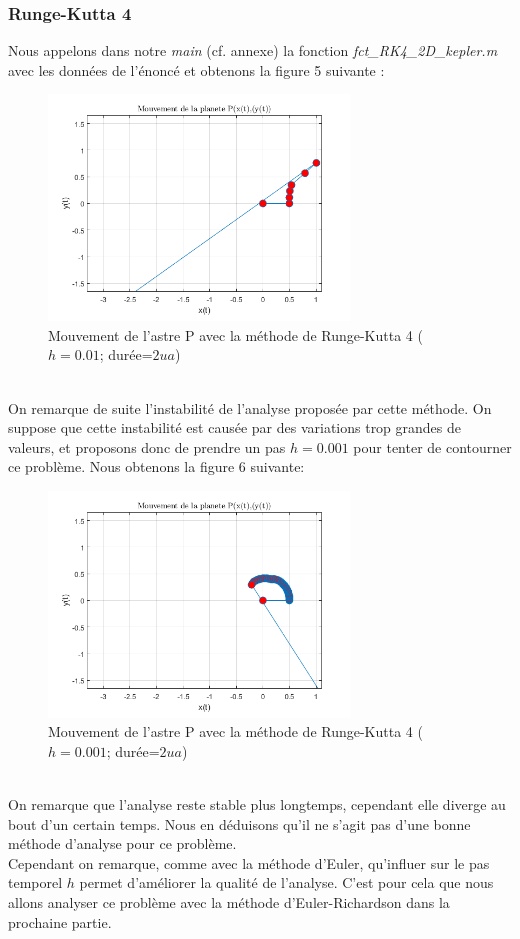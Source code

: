 \documentclass[11pt]{article} %
\begin{document}
\subsubsection{Runge-Kutta 4}
Nous appelons dans notre \textit{main} (cf. annexe) la fonction \textit{fct\_RK4\_2D\_kepler.m} avec les données de l'énoncé et obtenons la figure 5 suivante :
\begin{figure}[h]
\includegraphics[width=8cm]{fig_rk4_1}
\centering
\caption{Mouvement de l'astre P avec la méthode de Runge-Kutta 4 ($h=0.01$; durée=$2ua$)}
\end{figure}
\\On remarque de suite l'instabilité de l'analyse proposée par cette méthode. On suppose que cette instabilité est causée par des variations trop grandes de valeurs, et proposons donc de prendre un pas $h=0.001$ pour tenter de contourner ce problème. Nous obtenons la figure 6 suivante:
\begin{figure}[h]
\includegraphics[width=8cm]{fig_rk4_2}
\centering
\caption{Mouvement de l'astre P avec la méthode de Runge-Kutta 4 ($h=0.001$; durée=$2ua$)}
\end{figure}
\\On remarque que l'analyse reste stable plus longtemps, cependant elle diverge au bout d'un certain temps. Nous en déduisons qu'il ne s'agit pas d'une bonne méthode d'analyse pour ce problème. \\
Cependant on remarque, comme avec la méthode d'Euler, qu'influer sur le pas temporel $h$ permet d'améliorer la qualité de l'analyse. C'est pour cela que nous allons analyser ce problème avec la méthode d'Euler-Richardson dans la prochaine partie.
\clearpage
\end{document}
